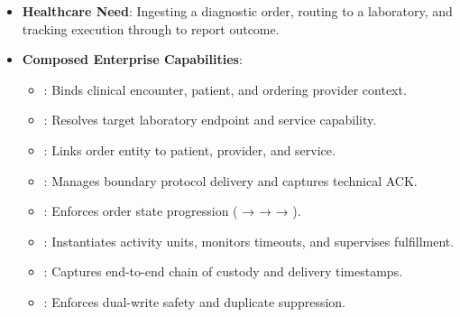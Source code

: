 \begin{itemize}

\item
\textbf{Healthcare Need}: Ingesting a diagnostic order, routing to a laboratory, and tracking execution through to report outcome.



\item
\textbf{Composed Enterprise Capabilities}:


\begin{itemize}

\item
\texttt{}: Binds clinical encounter, patient, and ordering provider context.



\item
\texttt{}: Resolves target laboratory endpoint and service capability.



\item
\texttt{}: Links order entity to patient, provider, and service.



\item
\texttt{}: Manages boundary protocol delivery and captures technical ACK.



\item
\texttt{}: Enforces order state progression (\texttt{} → \texttt{} → \texttt{} → \texttt{}).



\item
\texttt{}: Instantiates activity units, monitors timeouts, and supervises fulfillment.



\item
\texttt{}: Captures end-to-end chain of custody and delivery timestamps.



\item
\texttt{}: Enforces dual-write safety and duplicate suppression.



\end{itemize}


\end{itemize}
\label{rad:enterprise:303}

